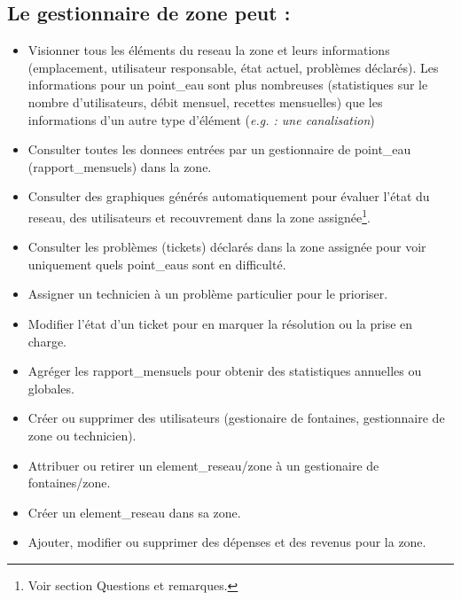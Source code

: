 \documentclass[a4paper, 11pt]{article}
\begin{document}

\subsection{Le gestionnaire de \gls{zone} peut :}
\begin{itemize}
  \item Visionner tous les éléments du \gls{reseau} la \gls{zone} et leurs informations (emplacement, \gls{utilisateur} responsable, état actuel, problèmes déclarés). Les informations pour un \gls{point_eau} sont plus nombreuses (statistiques sur le nombre d'\glspl{utilisateur}, débit mensuel, recettes mensuelles) que les informations d'un autre type d'élément (\emph{e.g. : une canalisation})
  \item Consulter toutes les \glspl{donnee} entrées par un gestionnaire de \gls{point_eau} (\glspl{rapport_mensuel}) dans la \gls{zone}.
  \item Consulter des graphiques générés automatiquement pour évaluer l'état du \gls{reseau}, des \glspl{utilisateur} et recouvrement dans la \gls{zone} assignée\footnote{Voir section Questions et remarques.}.
  \item Consulter les problèmes (\glspl{ticket}) déclarés dans la \gls{zone} assignée pour voir uniquement quels \glspl{point_eau} sont en difficulté.
  \item Assigner un technicien à un problème particulier pour le prioriser.
  \item Modifier l'état d'un \gls{ticket} pour en marquer la résolution ou la prise en charge.
  \item Agréger les \glspl{rapport_mensuel} pour obtenir des statistiques annuelles ou globales. %
  \item Créer ou supprimer des \glspl{utilisateur} (gestionaire de \glspl{fontaine}, gestionnaire de \gls{zone} ou technicien). %
  \item Attribuer ou retirer un \gls{element_reseau}/\gls{zone} à un gestionaire de \glspl{fontaine}/\gls{zone}.
  \item Créer un \gls{element_reseau} dans sa \gls{zone}.
  \item Ajouter, modifier ou supprimer des dépenses et des revenus pour la \gls{zone}.
\end{itemize}
\end{document}
